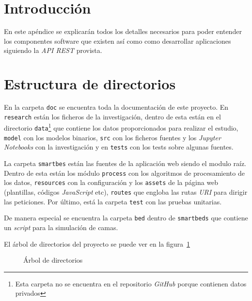 
\section{Introducción}

En este apéndice se explicarán todos los detalles necesarios para poder entender los componentes software que existen así como como desarrollar aplicaciones siguiendo la \textit{API REST} provista.

\section{Estructura de directorios}

En la carpeta \texttt{doc} se encuentra toda la documentación de este proyecto. En \texttt{research} están los ficheros de la investigación, dentro de esta están en el directorio \texttt{data}\footnote{Esta carpeta no se encuentra en el repositorio \textit{GitHub} porque contienen datos privados} que contiene los datos proporcionados para realizar el estudio, \texttt{model} con los modelos binarios, \texttt{src} con los ficheros fuentes y los \textit{Jupyter Notebooks} con la investigación y en \texttt{tests} con los tests sobre algunas fuentes.

La carpeta \texttt{smartbes} están las fuentes de la aplicación web siendo el modulo raíz. Dentro de esta están los módulo \texttt{process} con los algoritmos de procesamiento de los datos, \texttt{resources} con la configuración y los \texttt{assets} de la página web (plantillas, códigos \textit{JavaScript} etc), \texttt{routes} que engloba las rutas \textit{URI} para dirigir las peticiones. Por último, está la carpeta \texttt{test} con las pruebas unitarias.

De manera especial se encuentra la carpeta \texttt{bed} dentro de \texttt{smartbeds} que contiene un \textit{script} para la simulación de camas.

El árbol de directorios del proyecto se puede ver en la figura~\ref{fig:dirtree}

\begin{figure}
	\caption{Árbol de directorios}
	\label{fig:dirtree}
\end{figure}


